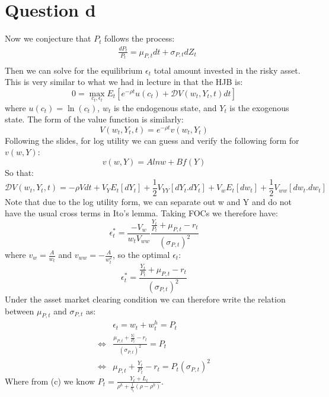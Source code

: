 \documentclass{article}
\begin{document}
\section*{Question d}
Now we conjecture that $P_t$ follows the process:
\[
\begin{aligned}
    &\frac{d P_{t}}{P_{t}}=\mu_{P, t} d t+\sigma_{P, t} d Z_{t}\\
\end{aligned}
\]
Then we can solve for the equilibrium $\epsilon_t$ total amount invested in the risky asset. This is very similar to what we had in lecture in that the HJB is:
\[
0 = \max_{c_t, \epsilon_t}E_t[e^{-\rho t}u(c_t) + \mathcal{D} V(w_t, Y_t, t) d t]    
\]
where $u(c_t) = \ln(c_t) $, $w_t$ is the endogenous state, and $Y_t$ is the exogenous state. The form of the value function is similarly:
\[
V(w_t, Y_t, t) = e^{-\rho t} v(w_t, Y_t)    
\]
Following the slides, for log utility we can guess and verify the following form for $v(w, Y)$:
\[
v(w,Y) = A ln w + B f(Y)
\]
So that:
\[
 \mathcal{D} V(w_t, Y_t, t) = -\rho V dt + V_YE_t[dY_t] + \frac{1}{2}V_{YY}[dY_t.dY_t]+V_wE_t[dw_t]+\frac{1}{2}V_{ww}[dw_t.dw_t]
\]
Note that due to the log utility form,  we can separate out w and Y and do not have the usual cross terms in Ito's lemma. Taking FOCs we therefore have:
\[
\epsilon_t^* = \frac{-V_w}{w_tV_{ww}}\frac{\frac{Y_t}{P_t} + \mu_{P, t} - r_t}{(\sigma_{P, t})^2}
\]
where $v_w=\frac{A}{w_t}$ and $v_{ww}=-\frac{A}{w_t^2}$, so the optimal $\epsilon_t$:
\[
\epsilon_t^* = \frac{\frac{Y_t}{P_t} + \mu_{P, t} - r_t}{(\sigma_{P, t})^2}    
\]
Under the asset market clearing condition we can therefore write the relation between $\mu_{P, t}$ and $\sigma_{P, t }$ as:
\[\begin{aligned}
   &\epsilon_t = w_t + w_t^h = P_t   \\ 
    \iff &\frac{ \mu_{P, t} + \frac{Y_t}{P_t} - r_t}{(\sigma_{P, t})^2} = P_t \\
    \iff & \mu_{P, t} + \frac{Y_t}{P_t} - r_t = P_t(\sigma_{P, t})^2
\end{aligned}\]
Where from (c) we know $P_t = \frac{Y_{t} + L_t}{\rho^h + \frac{1}{\eta_t}(\rho-\rho^h)}$.
\end{document}
